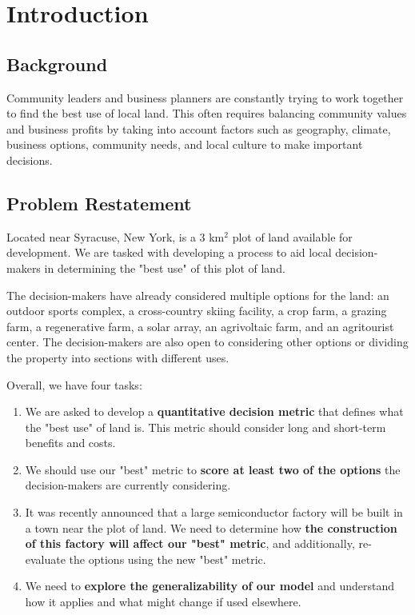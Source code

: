 \documentclass{mcmthesis}
\begin{document}
\newpage


\section{Introduction}

\subsection{Background}
Community leaders and business planners are constantly trying to work together to find the best use of local land. This often requires balancing community values and business profits by taking into account factors such as geography, climate, business options, community needs, and local culture to make important decisions.

\subsection{Problem Restatement}

Located near Syracuse, New York, is a 3 km$^2$ plot of land available for development. We are tasked with developing a process to aid local decision-makers in determining the "best use" of this plot of land. 

The decision-makers have already considered multiple options for the land: an outdoor sports 
complex, a cross-country skiing facility, a crop farm, a grazing farm, a 
regenerative farm, a solar array, an agrivoltaic farm, and an agritourist center. The decision-makers are also open to considering other options or dividing the property into sections with different uses. 

Overall, we have four tasks:

\begin{enumerate}
    \item We are asked to develop a \textbf{quantitative decision metric} that defines what the "best use" of land is. This metric should consider long and short-term benefits and costs.

    \item We should use our "best" metric to \textbf{score at least two of the options} the decision-makers are currently considering. 

    \item It was recently announced that a large semiconductor factory will be built in a town near the plot of land. We need to determine how \textbf{the construction of this factory will affect our "best" metric}, and additionally, re-evaluate the options using the new "best" metric.

    \item We need to \textbf{explore the generalizability of our model} and understand how it applies and what might change if used elsewhere.
\end{enumerate}
\end{document}
